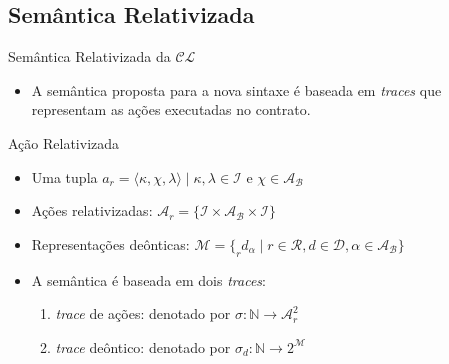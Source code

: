 \subsection{Semântica Relativizada}
    \begin{frame}{Semântica Relativizada da $\mathcal{CL}$}
        \begin{itemize}
            \item A semântica proposta para a nova sintaxe é baseada em \textit{traces} que representam as ações executadas no contrato.
        \end{itemize}
        \begin{block}{Ação Relativizada}
            \begin{itemize}
                \item Uma tupla $a_r = \langle\kappa,\chi,\lambda\rangle \mid \kappa,\lambda \in \mathcal{I}$ e $\chi \in \mathcal{A_B}$
                \item Ações relativizadas: $\mathcal{A}_r = \{\mathcal{I} \times \mathcal{A_B} \times \mathcal{I}\}$\\
            \end{itemize}
        \end{block}
        \begin{itemize}
            \item Representações deônticas: $\mathcal{M} = \{_rd_\alpha \mid r\in \mathcal{R}, d \in \mathcal{D}, \alpha \in \mathcal{A_B} \}$
            \item A semântica é baseada em dois \textit{traces}:
            \begin{enumerate}
                \item \textit{trace} de ações: denotado por $\sigma: \mathbb{N} \to \mathcal{A}^2_r$
                \item \textit{trace} deôntico: denotado por $\sigma_d: \mathbb{N} \to 2^\mathcal{M}$
            \end{enumerate}
        \end{itemize}
    \end{frame}
    
